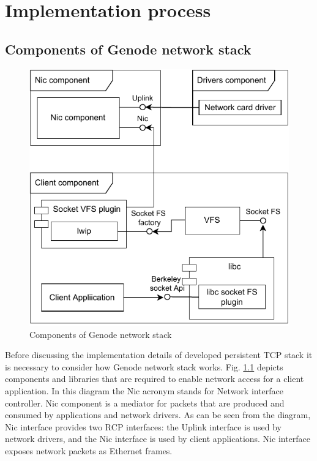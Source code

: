 \chapter{Implementation process}
\label{chap:impl}

\section{Components of Genode network stack}

\begin{figure}
    \centering
    \includegraphics[]{figs/genode-network-stack.pdf}
    \caption{Components of Genode network stack}
    \label{fig:net-components}
\end{figure}

Before discussing the implementation details of developed persistent TCP stack
it is necessary to consider how Genode network stack works. Fig.
\ref{fig:net-components} depicts components and libraries that are required to
enable network access for a client application. In this diagram the Nic acronym
stands for Network interface controller. Nic component is a mediator for
packets that are produced and consumed by applications and network drivers.  As
can be seen from the diagram, Nic interface provides two RCP interfaces: the
Uplink interface is used by network drivers, and the Nic interface is used by
client applications. Nic interface exposes network packets as Ethernet frames.

